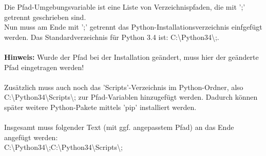 \documentclass[ngerman,oneside, a4letter]{article}
\begin{document}
\noindent Die Pfad-Umgebungsvariable ist eine Liste von Verzeichnispfaden, die mit ';' getrennt geschrieben sind.
\\
Nun muss am Ende mit ';' getrennt das Python-Installationsverzeichnis einfgefügt werden. Das Standardverzeichnis für Python 3.4 ist: C:\textbackslash Python34\textbackslash;.
\\
\\
\textbf{Hinweis:} Wurde der Pfad bei der Installation geändert, muss hier der geänderte Pfad eingetragen werden!
\\
\\
Zusätzlich muss auch noch das 'Scripts'-Verzeichnis im Python-Ordner, also C:\textbackslash Python34\textbackslash Scripts\textbackslash; zur Pfad-Variablen hinzugefügt werden. Dadurch können später weitere Python-Pakete mittels 'pip' installiert werden.
\\
\\
Insgesamt muss folgender Text (mit ggf. angepasstem Pfad) an das Ende angefügt werden:
\\

C:\textbackslash Python34\textbackslash;C:\textbackslash Python34\textbackslash Scripts\textbackslash;
\\

\begin{center}
\end{center}
\end{document}
